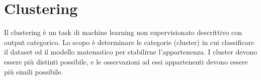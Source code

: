 \section{Clustering}
\label{sec:machine-learning.clustering}
Il clustering è un task di machine learning non supervisionato descrittivo con output categorico. Lo scopo è determinare le categorie (cluster) in cui classificare il dataset ed il modello matematico per stabilirne l'appartenenza. I cluster devono essere più distinti possibile, e le osservazioni ad essi appartenenti devono essere più simili possibile.
